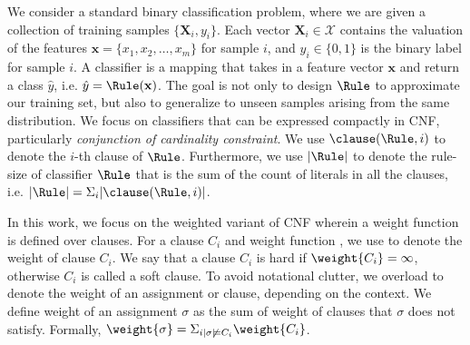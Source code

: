 We consider a standard binary classification problem, where we are given a collection of 
training samples $\{ \mathbf{X}_i, y_i \}$. Each vector $\mathbf{X}_i \in \mathcal{X}$ contains the valuation of the features $\mathbf{x} = \{x_1, x_2, \dots, x_m\}$ for sample $i$, and $y_i \in \{0,1\}$ is the binary label for sample $i$.
A classifier {\Rule} is a mapping that takes in a feature vector $\mathbf{x}$ and return a class $\hat{y}$, i.e. $\hat{y} = \Rule(\mathbf{x})$. The goal is not 
only to design $\Rule$ to approximate our training set, but also to generalize to unseen samples arising from the same distribution. 
We focus on classifiers that can be expressed compactly in CNF, particularly \emph{conjunction of cardinality constraint}. {We use $\clause(\Rule,i)$ to denote the $i$-th clause of $\Rule$}. {Furthermore, we use $|\Rule|$ to denote the rule-size of classifier $ \Rule $ that is the sum of the count of literals in all the clauses, i.e. $|\Rule| = \Sigma_i |\clause(\Rule,i)|$}. 











In this work, we focus on the weighted variant of CNF wherein a weight function is defined over clauses. For a clause $C_i$ and 
weight function {\weight{\cdot}}, we use {} to denote the weight of clause $C_i$. We say that a clause $C_i$ is hard if $\weight{C_i} = \infty$, otherwise $C_i$ is called a soft clause.  To avoid notational clutter, we overload {\weight{\cdot}} to denote the weight of an assignment or clause, depending on the context. We define weight of an assignment $\sigma$ as the sum of weight of clauses that $\sigma$ does not satisfy. Formally, $\weight{\sigma} = \Sigma_{i | \sigma \not\models C_i} \weight{C_i}$.


